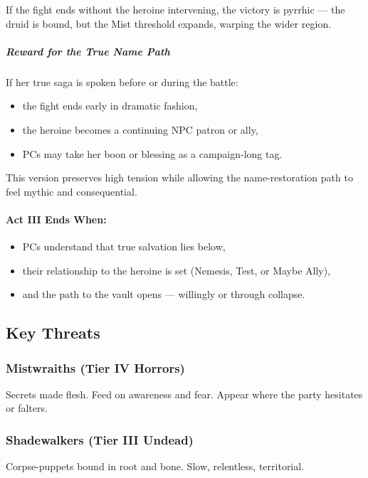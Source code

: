 \documentclass[11pt]{article}
\begin{document}
\noindent
If the fight ends without the heroine intervening, the victory is pyrrhic ---  
the druid is bound, but the Mist threshold expands, warping the wider region.

\subparagraph{Reward for the True Name Path}
If her true saga is spoken before or during the battle:
\begin{itemize}
  \item the fight ends early in dramatic fashion,
  \item the heroine becomes a continuing NPC patron or ally,
  \item PCs may take her boon or blessing as a campaign-long tag.
\end{itemize}

\noindent
This version preserves high tension while allowing the name-restoration path to feel mythic and consequential.

\paragraph{Act III Ends When:}
\begin{itemize}
  \item PCs understand that true salvation lies below,
  \item their relationship to the heroine is set (Nemesis, Test, or Maybe Ally),
  \item and the path to the vault opens --- willingly or through collapse.
\end{itemize}

\subsection{Key Threats}

\subsubsection*{Mistwraiths (Tier IV Horrors)}

Secrets made flesh. Feed on awareness and fear.  
Appear where the party hesitates or falters.

\subsubsection*{Shadewalkers (Tier III Undead)}

Corpse-puppets bound in root and bone.  
Slow, relentless, territorial.
\end{document}
